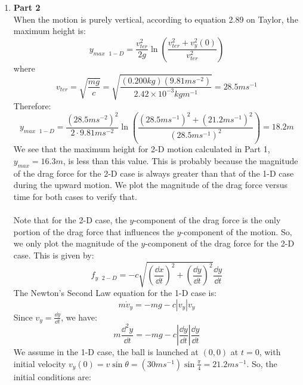 \documentclass{article}
\begin{document}
\begin{enumerate}
  \pagebreak \\ \\
  \item \textbf{Part 2}\\
  When the motion is purely vertical, according to equation 2.89 on Taylor\cite{Taylor2005}, the maximum height is:
  \begin{equation}
    y_{max\text{ }1-D} = \frac{v_{ter}^2}{2g} \ln \left(\frac{v_{ter}^2 + v_y^2(0)}{v_{ter}^2}\right)
  \end{equation}
  where
  \begin{equation}
    v_{ter} = \sqrt{\frac{mg}{c}} =\sqrt{\frac{(0.200kg)(9.81ms^{-2})}{2.42\times 10^{-3}kgm^{-1}}} = 28.5ms^{-1}
  \end{equation}
  Therefore:
  \begin{equation}
    y_{max\text{ }1-D} =\frac{( 28.5ms^{-2})^2}{2\cdot 9.81ms^{-2}} \ln \left(\frac{(28.5ms^{-1})^2 + (21.2ms^{-1})^2}{(28.5ms^{-1})^2}\right) = 18.2 m
  \end{equation}
  We see that the maximum height for 2-D motion calculated in Part 1, \(y_{max} = 16.3m\), is less than this value.
  This is probably because the magnitude of the drag force for the 2-D case is always greater than that of the 1-D case
  during the upward motion.
  We plot the magnitude of the drag force versus time for both cases to verify that. \\
  \\
  Note that for the 2-D case, the \(y\)-component of the drag force is the only portion of the drag force that influences
  the \(y\)-component of the motion. So, we only plot the magnitude of the \(y\)-component of the drag force for the 2-D case.
  This is given by:
  \begin{equation}
    f_{y\text{ }2-D} = -c \sqrt{\left(\frac{\dd x}{\dd t}\right)^2 + \left(\frac{\dd y}{\dd t}\right)^2 } \frac{\dd y}{\dd t}
  \end{equation}
  The Newton's Second Law equation for the 1-D case is:
  \begin{equation}
    m \dot{v}_y = -mg -c|v_y| v_y
  \end{equation}
  Since \(v_y =\frac{\dd y}{\dd t}\), we have:
  \begin{equation}
    m \frac{\dd^2 y}{\dd t} = -mg -c\left|\frac{\dd y}{\dd t}\right| \frac{\dd y}{\dd t}
  \end{equation}
  We assume in the 1-D case, the ball is launched at \((0,0)\) at \(t=0\), with initial velocity \(v_y(0)=v \sin\theta = (30ms^{-1})\sin\frac{\pi}{4} = 21.2 ms^{-1}\). So, the initial conditions are:

\end{enumerate}
\end{document}
